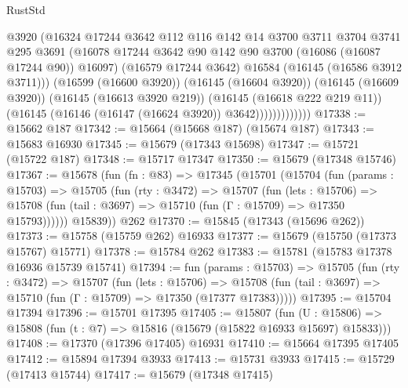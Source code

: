 \begin{lexlean}{RustStd}
\begin{coremodule}
                          @3920
                          (@16324
                            @17244
                            @3642
                            @112
                            @116
                            @142
                            @14
                            @3700
                            @3711
                            @3704
                            @3741
                            @295
                            @3691
                            (@16078
                              @17244
                              @3642
                              @90
                              @142
                              @90
                              @3700
                              (@16086 (@16087 @17244 @90))
                              @16097)
                            (@16579 @17244 @3642)
                            @16584
                            (@16145 (@16586 @3912 @3711)))
                          (@16599 (@16600 @3920))
                          (@16145 (@16604 @3920))
                          (@16145 (@16609 @3920))
                          (@16145 (@16613 @3920 @219))
                          (@16145 (@16618 @222 @219 @11))
                          (@16145 (@16146 (@16147 (@16624 @3920)) @3642)))))))))))))
@17338 := @15662 @187
@17342 := @15664 (@15668 @187) (@15674 @187)
@17343 := @15683 @16930
@17345 := @15679 (@17343 @15698)
@17347 := @15721 (@15722 @187)
@17348 := @15717 @17347
@17350 := @15679 (@17348 @15746)
@17367 := @15678
    (fun (fn : @83) =>
    @17345
      (@15701
        (@15704
          (fun (params : @15703) =>
          @15705
            (fun (rty : @3472) =>
            @15707
              (fun (lets : @15706) =>
              @15708 (fun (tail : @3697) => @15710 (fun (Γ : @15709) => @17350 @15793))))))
        @15839))
    @262
@17370 := @15845 (@17343 (@15696 @262))
@17373 := @15758 (@15759 @262) @16933
@17377 := @15679 (@15750 (@17373 @15767) @15771)
@17378 := @15784 @262
@17383 := @15781 (@15783 @17378 @16936 @15739 @15741)
@17394 := fun (params : @15703) =>
  @15705
    (fun (rty : @3472) =>
    @15707
      (fun (lets : @15706) =>
      @15708 (fun (tail : @3697) => @15710 (fun (Γ : @15709) => @17350 (@17377 @17383)))))
@17395 := @15704 @17394
@17396 := @15701 @17395
@17405 := @15807
    (fun (U : @15806) => @15808 (fun (t : @7) => @15816 (@15679 (@15822 @16933 @15697) @15833)))
@17408 := @17370 (@17396 @17405) @16931
@17410 := @15664 @17395 @17405
@17412 := @15894 @17394 @3933
@17413 := @15731 @3933
@17415 := @15729 (@17413 @15744)
@17417 := @15679 (@17348 @17415)

\end{coremodule}
\end{lexlean}
